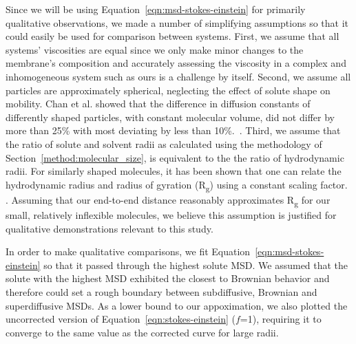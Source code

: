 \documentclass[journal=jpcbfk,manuscript=article]{achemso}
\begin{document}
  Since we will be using Equation~\ref{eqn:msd-stokes-einstein} for primarily qualitative observations, 
  we made a number of simplifying assumptions so that it could easily be used for 
  comparison between systems. First, we assume that all systems' viscosities
  are equal since we only make minor changes to the membrane's composition and
  accurately assessing the viscosity in a complex and inhomogeneous system such 
  as ours is a challenge by itself. Second, we assume all particles are approximately
  spherical, neglecting the effect of solute shape on mobility. Chan et al. 
  showed that the difference in diffusion constants of differently shaped 
  particles, with constant molecular volume, did not differ by more than 25\%
  with most deviating by less than 10\%.~\cite{chan_effects_2015}. 
  Third, we assume that the ratio of solute and solvent radii as calculated using the
  methodology of Section~\ref{method:molecular_size}, is equivalent to the the 
  ratio of hydrodynamic radii. For similarly shaped molecules, it has been shown that
  one can relate the hydrodynamic radius and radius of gyration (R\textsubscript{g})
  using a constant scaling factor. \cite{lee_molecular_2008,he_novel_2003,li_critical_2009}.
  Assuming that our end-to-end distance reasonably approximates R\textsubscript{g} 
  for our small, relatively inflexible molecules, we believe this assumption is 
  justified for qualitative demonstrations relevant to this study. 
  
  In order to make qualitative comparisons, we fit Equation~\ref{eqn:msd-stokes-einstein}
  so that it passed through the highest solute MSD. We assumed that the solute
  with the highest MSD exhibited the closest to Brownian behavior and therefore could set
  a rough boundary between subdiffusive, Brownian and superdiffusive MSDs. As a lower
  bound to our appoximation, we also plotted the uncorrected version of 
  Equation~\ref{eqn:stokes-einstein} ($f$=1), requiring it to converge to the same 
  value as the corrected curve for large radii. 

  
\end{document}
